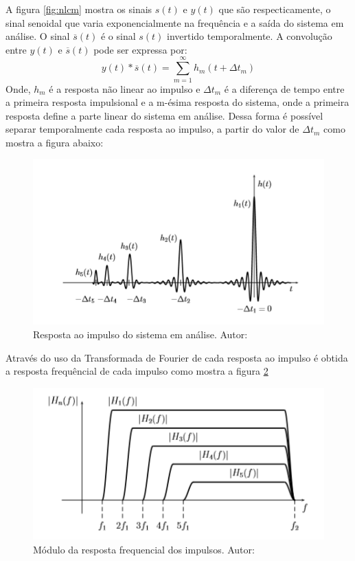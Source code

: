 A figura \ref{fig:nlcm} mostra os sinais $s(t)$ e $y(t)$ que são respecticamente, o sinal senoidal que varia exponencialmente na frequência e a saída do sistema em análise. O sinal $\overline{s}(t)$ é o sinal $s(t)$ invertido temporalmente. A convolução entre $y(t)$ e $\overline{s}(t)$ pode ser expressa por:
\begin{equation}
y(t) \ast \overline{s}(t) = \sum_{m=1}^{\infty}h_{m}(t + \Delta t_{m})
\label{kernel}
\end{equation}
Onde, $h_{m}$ é a resposta não linear ao impulso e $\Delta t_{m}$ é a diferença de tempo entre a primeira resposta impulsional e a m-ésima resposta do sistema, onde a primeira resposta define a parte linear do sistema em análise. Dessa forma é possível separar temporalmente cada resposta ao impulso, a partir do valor de $\Delta t_{m}$ como mostra a figura abaixo:

\begin{figure}
	\centering
	\includegraphics[width=0.6\linewidth]{figuras/NLCIR}
	\caption{Resposta ao impulso do sistema em análise. Autor: \cite{novakdissertation}}
	\label{fig:nlcir}
\end{figure}

Através do uso da Transformada de Fourier de cada resposta ao impulso é obtida a resposta frequêncial de cada impulso como mostra a figura \ref{fig:nlcfr}
\begin{figure}
	\centering
	\includegraphics[width=0.6\linewidth]{figuras/NLCFR}
	\caption{Módulo da resposta frequencial dos impulsos. Autor:\cite{novakdissertation}}
	\label{fig:nlcfr}
\end{figure}

